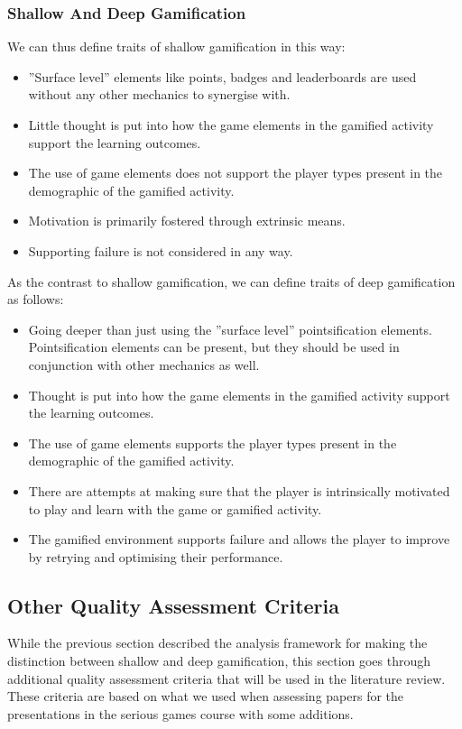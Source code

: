 \subsubsection{Shallow And Deep Gamification}
We can thus define traits of shallow gamification in this way:
\begin{itemize}
    \item ''Surface level'' elements like points, badges and leaderboards are used without any other mechanics to synergise with.
    \item Little thought is put into how the game elements in the gamified activity support the learning outcomes. 
    \item The use of game elements does not support the player types present in the demographic of the gamified activity.
    \item Motivation is primarily fostered through extrinsic means. 
    \item Supporting failure is not considered in any way. 
\end{itemize}

As the contrast to shallow gamification, we can define traits of deep gamification as follows:
\begin{itemize}
    \item Going deeper than just using the ''surface level'' pointsification elements. Pointsification elements can be present, but they should be used in conjunction with other mechanics as well. 
    \item Thought is put into how the game elements in the gamified activity support the learning outcomes.
    \item The use of game elements supports the player types present in the demographic of the gamified activity.
    \item There are attempts at making sure that the player is intrinsically motivated to play and learn with the game or gamified activity. 
    \item The gamified environment supports failure and allows the player to improve by retrying and optimising their performance. 
\end{itemize}


\subsection{Other Quality Assessment Criteria}
While the previous section described the analysis framework for making the distinction between shallow and deep gamification, this section goes through additional quality assessment criteria that will be used in the literature review. These criteria are based on what we used when assessing papers for the presentations in the serious games course with some additions. 

